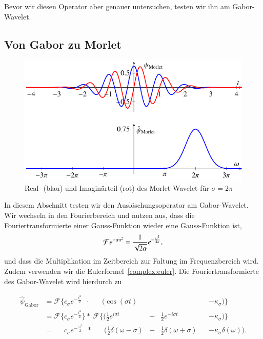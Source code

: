 Bevor wir diesen Operator aber genauer untersuchen, testen wir ihn am Gabor-Wavelet.

\subsection{Von Gabor zu Morlet}
\label{complex:gabor-to-morlet}

\begin{figure}
	\centering
	\includegraphics{papers/complex/images/morlet.pdf}
	\caption{Real- (blau) und Imaginärteil (rot) des Morlet-Wavelet für $\sigma = 2\pi$ \label{complex:morlet}}
\end{figure}

In diesem Abschnitt testen wir den Auslöschungsoperator am Gabor-Wavelet.
Wir wechseln in den Fourierbereich und nutzen aus, dass die Fouriertransformierte einer Gauss-Funktion wieder eine Gauss-Funktion ist,
\[
	\Four e^{-\alpha x^2} 
	= \frac{1}{\sqrt{2\alpha}}e^{- \frac{\omega^2}{4\alpha}},
\]
und dass die Multiplikation im Zeitbereich zur Faltung im Frequenzbereich wird.
Zudem verwenden wir die Eulerformel~\eqref{complex:euler}.
Die Fouriertransformierte des Gabor-Wavelet wird hierdurch zu

\begin{equation*}
\begin{aligned}
 \hat{\psi}_\text{Gabor}
 & = \mathcal{F}\Bigg\lbrace c_\sigma e^{-\frac{t^2}{2}}\phantom{\Bigg\rbrace}
 \cdot\; \phantom{\mathcal{F}\Bigg\lbrace}
 \Bigg(\cos\left(\sigma t\right) &&
 &&- \kappa_\sigma\Bigg) \Bigg\rbrace \\
 & = \mathcal{F}\Bigg\lbrace c_\sigma e^{-\frac{t^2}{2}} \Bigg\rbrace 
 *\: \mathcal{F}\Bigg\lbrace\Bigg( \frac12 e^{i\sigma t} &+& \frac12 e^{-i\sigma t}
 &&- \kappa_\sigma \Bigg)\Bigg\rbrace\\
 & = \phantom{\mathcal{F}\Bigg\lbrace} c_\sigma e^{- \frac{\omega^2}{2}} \phantom{\Big\rbrace}
 *\:\phantom{\mathcal{F}\Bigg\lbrace} \Bigg(
  \frac{1}{2}\delta(\omega - \sigma) &-&
  \frac{1}{2}\delta(\omega + \sigma) 
 && - \kappa_\sigma\delta(\omega)
  \Bigg).
\end{aligned}
\end{equation*}

